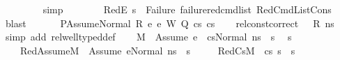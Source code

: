 \begin{isabellebody}
\ \ \ \ \ \ \ \isamarkupfalse%
\ simp\isanewline
\ \ \ \ \ \ \isamarkupfalse%
\ RedE{}\ {\isacartoucheopen}s{\isacharprime}{\kern0pt}\ {\isacharequal}{\kern0pt}\ Failure{\isacartoucheclose}\ failure{\isacharunderscore}{\kern0pt}red{\isacharunderscore}{\kern0pt}cmd{\isacharunderscore}{\kern0pt}list\ RedCmdListCons\ \isamarkupfalse%
\ blast\isanewline
\ \ \isamarkupfalse%
\isanewline
{}\isamarkupfalse%
\isanewline
\ \ \isamarkupfalse%
\ {\isacharparenleft}{\kern0pt}PAssumeNormal\ R\ e{}\ e{}\ W\ Q\ cs{}\ cs{}{\isacharparenright}{\kern0pt}\isanewline
\ \ \isamarkupfalse%
\ {\isachardoublequoteopen}rel{\isacharunderscore}{\kern0pt}const{\isacharunderscore}{\kern0pt}correct\ {\isasymLambda}\ {\isasymOmega}\ R\ ns{\isachardoublequoteclose}\ \isamarkupfalse%
\ {\isacharparenleft}{\kern0pt}simp\ add{\isacharcolon}{\kern0pt}\ rel{\isacharunderscore}{\kern0pt}well{\isacharunderscore}{\kern0pt}typed{\isacharunderscore}{\kern0pt}def{\isacharparenright}{\kern0pt}\isanewline
\ \ \isamarkupfalse%
\ {\isacartoucheopen}M{\isacharcomma}{\kern0pt}{\isasymLambda}{\isacharcomma}{\kern0pt}{\isasymGamma}{\isacharcomma}{\kern0pt}{\isasymOmega}\ {\isasymturnstile}\ {\isasymlangle}Assume\ e{}\ {\isacharhash}{\kern0pt}\ cs{}{\isacharcomma}{\kern0pt}Normal\ ns{\isasymrangle}\ {\isacharbrackleft}{\kern0pt}{\isasymrightarrow}{\isacharbrackright}{\kern0pt}\ s{\isacharprime}{\kern0pt}{\isacartoucheclose}\ \isamarkupfalse%
\ s{\isacharprime}{\kern0pt}{\isacharprime}{\kern0pt}\ \ \isanewline
\ \ \ \ RedAssume{\isacharcolon}{\kern0pt}{\isachardoublequoteopen}M{\isacharcomma}{\kern0pt}{\isasymLambda}{\isacharcomma}{\kern0pt}{\isasymGamma}{\isacharcomma}{\kern0pt}{\isasymOmega}\ {\isasymturnstile}\ {\isasymlangle}Assume\ e{}{\isacharcomma}{\kern0pt}Normal\ ns{\isasymrangle}\ {\isasymrightarrow}\ s{\isacharprime}{\kern0pt}{\isacharprime}{\kern0pt}{\isachardoublequoteclose}\ \isanewline
\ \ \ \ RedCs{}{\isacharcolon}{\kern0pt}{\isachardoublequoteopen}M{\isacharcomma}{\kern0pt}{\isasymLambda}{\isacharcomma}{\kern0pt}{\isasymGamma}{\isacharcomma}{\kern0pt}{\isasymOmega}\ {\isasymturnstile}\ {\isasymlangle}cs{}{\isacharcomma}{\kern0pt}\ s{\isacharprime}{\kern0pt}{\isacharprime}{\kern0pt}{\isasymrangle}\ {\isacharbrackleft}{\kern0pt}{\isasymrightarrow}{\isacharbrackright}{\kern0pt}\ s{\isacharprime}{\kern0pt}{\isachardoublequoteclose}\ \isanewline

\end{isabellebody}
